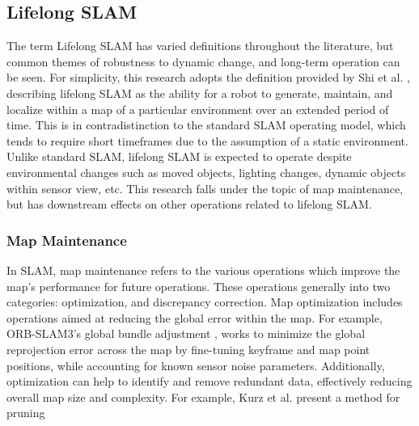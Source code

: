 \subsection{Lifelong SLAM}

The term Lifelong SLAM has varied definitions throughout the literature, but common themes of robustness to dynamic change, and long-term operation can be seen. For simplicity, this research adopts the definition provided by Shi et al. \cite{shiAreWeReady2020}, describing lifelong SLAM as the ability for a robot to generate, maintain, and localize within a map of a particular environment over an extended period of time. This is in contradistinction to the standard SLAM operating model, which tends to require short timeframes due to the assumption of a static environment. Unlike standard SLAM, lifelong SLAM is expected to operate despite environmental changes such as moved objects, lighting changes, dynamic objects within sensor view, etc. This research falls under the topic of map maintenance, but has downstream effects on other operations related to lifelong SLAM.

\subsubsection{Map Maintenance}

In SLAM, map maintenance refers to the various operations which improve the map's performance for future operations. These operations generally into two categories: optimization, and discrepancy correction. Map optimization includes operations aimed at reducing the global error within the map. For example, ORB-SLAM3's global bundle adjustment \cite{camposORBSLAM3AccurateOpenSource2021}, works to minimize the global reprojection error across the map by fine-tuning keyframe and map point positions, while accounting for known sensor noise parameters. Additionally, optimization can help to identify and remove redundant data, effectively reducing overall map size and complexity. For example, Kurz et al. \cite{kurzGeometrybasedGraphPruning2021} present a method for pruning 